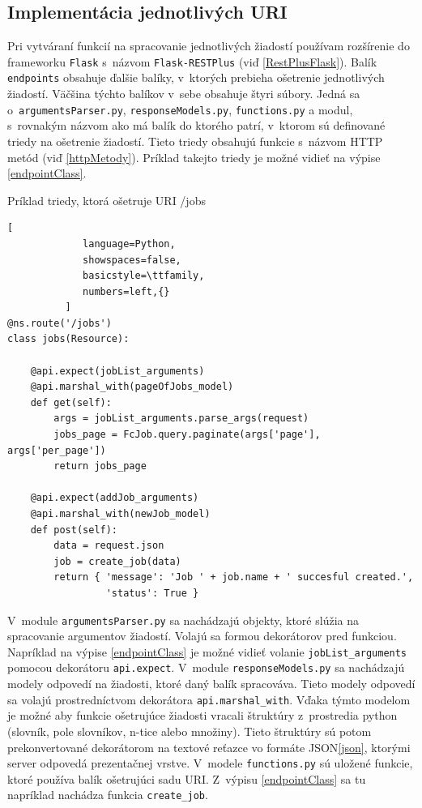 \documentclass[slovak]{fitthesis}
\begin{document}
\subsection{Implementácia jednotlivých URI}
Pri vytváraní funkcií na spracovanie jednotlivých žiadostí používam rozšírenie do frameworku \texttt{Flask} s~názvom \texttt{Flask-RESTPlus} (viď \ref{RestPlusFlask}). Balík \texttt{endpoints} obsahuje ďalšie balíky, v~ktorých prebieha ošetrenie jednotlivých žiadostí. Väčšina týchto balíkov v~sebe obsahuje štyri súbory. Jedná sa o~\texttt{argumentsParser.py}, \texttt{responseModels.py}, \texttt{functions.py} a modul, s~rovnakým názvom ako má balík do ktorého patrí, v~ktorom sú definované triedy na ošetrenie žiadostí. Tieto triedy obsahujú funkcie s~názvom HTTP metód (viď \ref{httpMetody}). Príklad takejto triedy je možné vidieť na výpise \ref{endpointClass}.
\begin{algorithm}
  \caption{Príklad triedy, ktorá ošetruje URI /jobs}
  \label{endpointClass}
  \begin{lstlisting}[
             language=Python,
             showspaces=false,
             basicstyle=\ttfamily,
             numbers=left,{}
          ]
@ns.route('/jobs')
class jobs(Resource):

    @api.expect(jobList_arguments)
    @api.marshal_with(pageOfJobs_model)
    def get(self):
        args = jobList_arguments.parse_args(request)
        jobs_page = FcJob.query.paginate(args['page'], args['per_page'])
        return jobs_page

    @api.expect(addJob_arguments)
    @api.marshal_with(newJob_model)
    def post(self):
        data = request.json
        job = create_job(data)
        return { 'message': 'Job ' + job.name + ' succesful created.',
                 'status': True }
  \end{lstlisting}
\end{algorithm}
V~module \texttt{argumentsParser.py} sa nachádzajú objekty, ktoré slúžia na spracovanie argumentov žiadostí. Volajú sa formou dekorátorov pred funkciou. Napríklad na výpise \ref{endpointClass} je možné vidieť volanie \texttt{jobList\_arguments} pomocou dekorátoru \texttt{api.expect}. V~module \texttt{responseModels.py} sa nachádzajú modely odpovedí na žiadosti, ktoré daný balík spracováva. Tieto modely odpovedí sa volajú prostredníctvom dekorátora \texttt{api.marshal\_with}. Vďaka týmto modelom je možné aby funkcie ošetrujúce žiadosti vracali štruktúry z~prostredia python (slovník, pole slovníkov, n-tice alebo množiny). Tieto štruktúry sú potom prekonvertované dekorátorom na textové reťazce vo formáte JSON\ref{json}, ktorými server odpovedá prezentačnej vrstve. V~modele \texttt{functions.py} sú uložené funkcie, ktoré používa balík ošetrujúci sadu URI. Z~výpisu \ref{endpointClass} sa tu napríklad nachádza funkcia \texttt{create\_job}.
\end{document}

